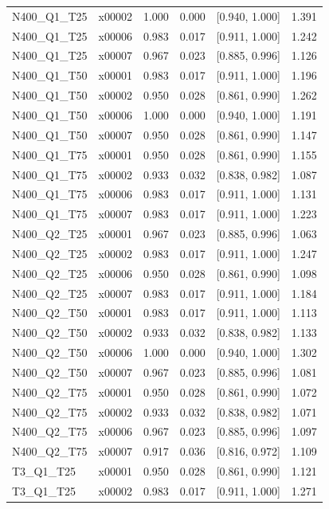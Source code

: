 \begin{longtable}{lrrrrr}
N400\_Q1\_T25 & x00002 & 1.000 & 0.000 & [0.940, 1.000] & 1.391 \\
N400\_Q1\_T25 & x00006 & 0.983 & 0.017 & [0.911, 1.000] & 1.242 \\
N400\_Q1\_T25 & x00007 & 0.967 & 0.023 & [0.885, 0.996] & 1.126 \\
N400\_Q1\_T50 & x00001 & 0.983 & 0.017 & [0.911, 1.000] & 1.196 \\
N400\_Q1\_T50 & x00002 & 0.950 & 0.028 & [0.861, 0.990] & 1.262 \\
N400\_Q1\_T50 & x00006 & 1.000 & 0.000 & [0.940, 1.000] & 1.191 \\
N400\_Q1\_T50 & x00007 & 0.950 & 0.028 & [0.861, 0.990] & 1.147 \\
N400\_Q1\_T75 & x00001 & 0.950 & 0.028 & [0.861, 0.990] & 1.155 \\
N400\_Q1\_T75 & x00002 & 0.933 & 0.032 & [0.838, 0.982] & 1.087 \\
N400\_Q1\_T75 & x00006 & 0.983 & 0.017 & [0.911, 1.000] & 1.131 \\
N400\_Q1\_T75 & x00007 & 0.983 & 0.017 & [0.911, 1.000] & 1.223 \\
N400\_Q2\_T25 & x00001 & 0.967 & 0.023 & [0.885, 0.996] & 1.063 \\
N400\_Q2\_T25 & x00002 & 0.983 & 0.017 & [0.911, 1.000] & 1.247 \\
N400\_Q2\_T25 & x00006 & 0.950 & 0.028 & [0.861, 0.990] & 1.098 \\
N400\_Q2\_T25 & x00007 & 0.983 & 0.017 & [0.911, 1.000] & 1.184 \\
N400\_Q2\_T50 & x00001 & 0.983 & 0.017 & [0.911, 1.000] & 1.113 \\
N400\_Q2\_T50 & x00002 & 0.933 & 0.032 & [0.838, 0.982] & 1.133 \\
N400\_Q2\_T50 & x00006 & 1.000 & 0.000 & [0.940, 1.000] & 1.302 \\
N400\_Q2\_T50 & x00007 & 0.967 & 0.023 & [0.885, 0.996] & 1.081 \\
N400\_Q2\_T75 & x00001 & 0.950 & 0.028 & [0.861, 0.990] & 1.072 \\
N400\_Q2\_T75 & x00002 & 0.933 & 0.032 & [0.838, 0.982] & 1.071 \\
N400\_Q2\_T75 & x00006 & 0.967 & 0.023 & [0.885, 0.996] & 1.097 \\
N400\_Q2\_T75 & x00007 & 0.917 & 0.036 & [0.816, 0.972] & 1.109 \\
T3\_Q1\_T25 & x00001 & 0.950 & 0.028 & [0.861, 0.990] & 1.121 \\
T3\_Q1\_T25 & x00002 & 0.983 & 0.017 & [0.911, 1.000] & 1.271 \\

\end{longtable}
